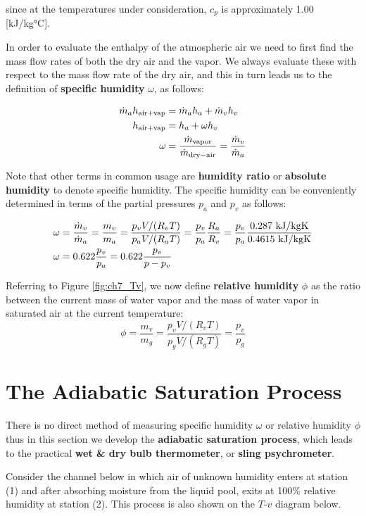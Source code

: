 since at the temperatures under consideration, $c_p$ is approximately 1.00 [kJ/kg°C].

In order to evaluate the enthalpy of the atmospheric air we need to first find the mass flow rates of both the dry air and the vapor. We always evaluate these with respect to the mass flow rate of the dry air, and this in turn leads us to the definition of {\bf specific humidity} $\omega$, as follows:

\begin{align}
  \nonumber \dot{m}_a h_{\rm air + vap} &= \dot{m}_a h_a + \dot{m}_v h_v\\
  \nonumber h_{\rm air + vap} &= h_a + \omega h_v\\
  \label{eq:specificHumidity} \omega &= \frac{\dot{m}_{\rm vapor}}{\dot{m}_{\rm dry-air}} = \frac{\dot{m}_{v}}{\dot{m}_{a}}
\end{align}

Note that other terms in common usage are {\bf humidity ratio} or {\bf absolute humidity} to denote specific humidity. The specific humidity can be conveniently determined in terms of the partial pressures $p_a$ and $p_v$ as follows:

\begin{align*}
  \omega &= \frac{\dot{m}_{v}}{\dot{m}_{a}} = \frac{{m}_{v}}{{m}_{a}} = \frac{p_v V / (R_vT)}{p_a V / (R_a T)} = \frac{p_v}{p_a} \frac{R_a}{R_v} =\frac{p_v}{p_a}\frac{0.287\ \rm kJ/kgK}{0.4615\ \rm kJ/kgK}\\
  \omega &= 0.622 \frac{p_v}{p_a} = 0.622 \frac{p_v}{p - p_v}
\end{align*}

Referring to Figure \ref{fig:ch7_Tv}, we now define {\bf relative humidity} $\phi$ as the ratio between the current mass of water vapor and the mass of water vapor in saturated air at the current temperature:
\begin{equation}
  \phi = \frac{m_v}{m_g} =\frac{p_v V / (R_vT)}{p_g V / (R_g T)} = \frac{p_v}{p_g}
\end{equation}

\section{The Adiabatic Saturation Process}

There is no direct method of measuring specific humidity $\omega$ or relative humidity $\phi$ thus in this section we develop the {\bf adiabatic saturation process}, which leads to the practical {\bf wet \& dry bulb thermometer}, or {\bf sling psychrometer}.

Consider the channel below in which air of unknown humidity enters at station (1) and after absorbing moisture from the liquid pool, exits at 100\% relative humidity at station (2). This process is also shown on the $T$-$v$ diagram below.



